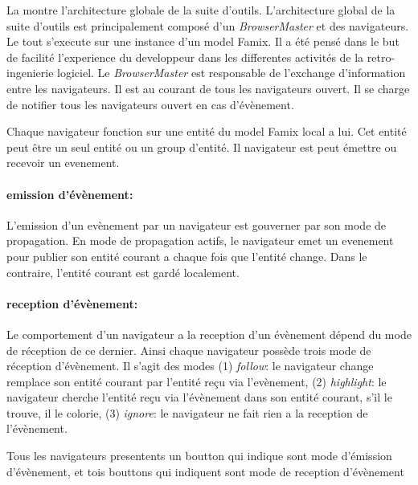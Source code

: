 \documentclass[a4paper]{article}
\newcommand{\browserMaster}{\textit{BrowserMaster} \xspace}
\begin{document}
La  montre l'architecture globale de la suite d'outils.
L'architecture global  de la suite d'outils est principalement composé d'un \browserMaster et des navigateurs.
Le tout s'execute sur une instance d'un model Famix. 
Il a été pensé dans le but de facilité l'experience du developpeur dans les differentes activités de la retro-ingenierie logiciel.
Le \browserMaster est responsable de l'exchange d'information entre les navigateurs.
Il est au courant de tous les navigateurs ouvert. 
Il se charge de notifier tous les navigateurs ouvert en cas d'évènement.

Chaque navigateur fonction sur une entité du model Famix  local a lui.
Cet entité peut être un seul entité ou un group d'entité.
Il navigateur est peut émettre ou recevoir un evenement. 
\paragraph{emission d'évènement:} L'emission d'un evènement par un navigateur est gouverner par son mode de propagation.
En mode de propagation actifs, le navigateur emet un evenement pour publier  son entité courant a chaque fois que l'entité change.
Dans le contraire, l'entité courant est gardé localement.

\paragraph{reception d'évènement: } Le comportement d'un navigateur a la reception d'un évènement dépend du mode de réception de ce dernier.
Ainsi chaque navigateur possède trois mode de réception d'évènement. 
Il s'agit des modes (1) \textit{follow}: le navigateur change remplace son entité courant par l'entité reçu via l'evènement,
(2) \textit{highlight}: le navigateur cherche l'entité reçu via l'évènement dans son entité courant, s'il le trouve, il le colorie,
(3) \textit{ignore}: le navigateur ne fait rien a la reception de l'évènement.

Tous les navigateurs presentents un boutton qui indique sont mode d'émission d'évènement, et tois bouttons qui indiquent sont mode de reception d'évènement
\end{document}
